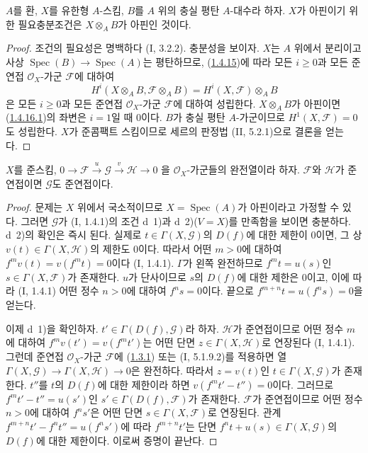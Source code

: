\begin{corollary}[1.4.16]
\label{III.1.4.16-fr}
$A$를 환, $X$를 유한형 $A$-스킴, $B$를 $A$ 위의 충실 평탄
$A$-대수라 하자. $X$가 아핀이기 위한 필요충분조건은
$X\otimes_A B$가 아핀인 것이다.
\end{corollary}

\begin{proof}
조건의 필요성은 명백하다 (I, 3.2.2). 충분성을 보이자. $X$는 $A$ 위에서
분리이고 사상 $\operatorname{Spec}(B)\to\operatorname{Spec}(A)$는
평탄하므로, (\hyperref[III.1.4.15-fr]{1.4.15})에 따라 모든 $i\geq0$과
모든 준연접 $\mathcal O_X$-가군 $\mathcal F$에 대하여
\begin{equation}
\label{III.1.4.16.1-fr}
\tag{1.4.16.1}
H^i(X\otimes_A B,\mathcal F\otimes_A B)
=H^i(X,\mathcal F)\otimes_A B
\end{equation}
은 모든 $i\geq0$과 모든 준연접 $\mathcal O_X$-가군 $\mathcal F$에
대하여 성립한다. $X\otimes_A B$가 아핀이면
(\hyperref[III.1.4.16.1-fr]{1.4.16.1})의 좌변은 $i=1$일 때 0이다.
$B$가 충실 평탄 $A$-가군이므로 $H^1(X,\mathcal F)=0$도 성립한다.
$X$가 준콤팩트 스킴이므로 세르의 판정법 (II, 5.2.1)으로 결론을 얻는다.
\end{proof}

\begin{proposition}[1.4.17]
\label{III.1.4.17-fr}
$X$를 준스킴,
$0\to\mathcal F\xrightarrow{u}\mathcal G\xrightarrow{v}\mathcal H\to0$
을 $\mathcal O_X$-가군들의 완전열이라 하자. $\mathcal F$와
$\mathcal H$가 준연접이면 $\mathcal G$도 준연접이다.
\end{proposition}

\begin{proof}
문제는 $X$ 위에서 국소적이므로 $X=\operatorname{Spec}(A)$가
아핀이라고 가정할 수 있다. 그러면 $\mathcal G$가 (I, 1.4.1)의 조건
d~1)과 d~2)($V=X$)를 만족함을 보이면 충분하다. d~2)의 확인은
즉시 된다. 실제로 $t\in\Gamma(X,\mathcal G)$의 $D(f)$에 대한 제한이
0이면, 그 상 $v(t)\in\Gamma(X,\mathcal H)$의 제한도 0이다. 따라서
어떤 $m>0$에 대하여 $f^mv(t)=v(f^mt)=0$이다 (I, 1.4.1).
$\Gamma$가 왼쪽 완전하므로 $f^mt=u(s)$인
$s\in\Gamma(X,\mathcal F)$가 존재한다. $u$가 단사이므로 $s$의
$D(f)$에 대한 제한은 0이고, 이에 따라 (I, 1.4.1) 어떤 정수 $n>0$에
대하여 $f^ns=0$이다. 끝으로
$f^{m+n}t=u(f^ns)=0$을 얻는다.

이제 d~1)을 확인하자. $t'\in\Gamma(D(f),\mathcal G)$라 하자.
$\mathcal H$가 준연접이므로 어떤 정수 $m$에 대하여
$f^mv(t')=v(f^mt')$는 어떤 단면 $z\in\Gamma(X,\mathcal H)$로
연장된다 (I, 1.4.1). 그런데 준연접 $\mathcal O_X$-가군
$\mathcal F$에 (\hyperref[III.1.3.1-fr]{1.3.1}) 또는
(I, 5.1.9.2)를 적용하면 열
$\Gamma(X,\mathcal G)\to\Gamma(X,\mathcal H)\to0$은 완전하다.
따라서 $z=v(t)$인 $t\in\Gamma(X,\mathcal G)$가 존재한다.
$t''$를 $t$의 $D(f)$에 대한 제한이라 하면
$v(f^mt'-t'')=0$이다. 그러므로
$f^mt'-t''=u(s')$인 $s'\in\Gamma(D(f),\mathcal F)$가 존재한다.
$\mathcal F$가 준연접이므로 어떤 정수 $n>0$에 대하여 $f^ns'$은
어떤 단면 $s\in\Gamma(X,\mathcal F)$로 연장된다. 관계
$f^{m+n}t'-f^nt''=u(f^ns')$에 따라 $f^{m+n}t'$는 단면
$f^nt+u(s)\in\Gamma(X,\mathcal G)$의 $D(f)$에 대한 제한이다. 이로써
증명이 끝난다.
\end{proof}

